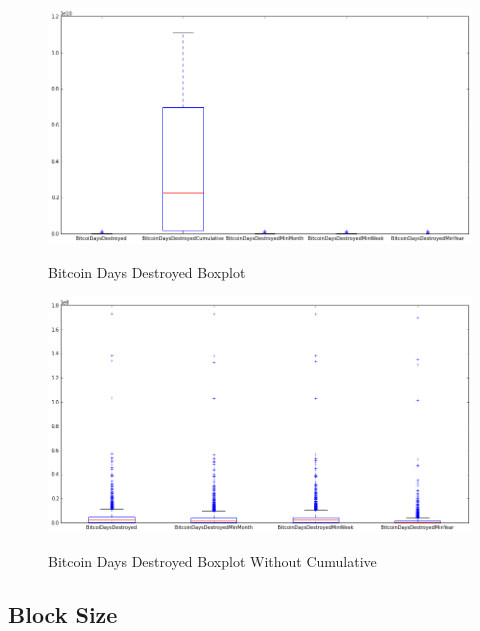 \begin{figure}[bth]
  \myfloatalign
  {\includegraphics[width=1\linewidth]
    {gfx/bitcoin-days-destroyed-boxplot}}
  \caption{Bitcoin Days Destroyed Boxplot}
  \label{fig:bitcoin-days-destroyed-boxplot}
\end{figure}

\begin{figure}[bth]
  \myfloatalign
  {\includegraphics[width=1\linewidth]
    {gfx/bitcoin-days-destroyed-boxplot-rest}}
  \caption{Bitcoin Days Destroyed Boxplot Without Cumulative}
  \label{fig:bitcoin-days-destroyed-boxplot-rest}
\end{figure}

\clearpage


\subsection{Block Size}
\label{sec:block-size}


